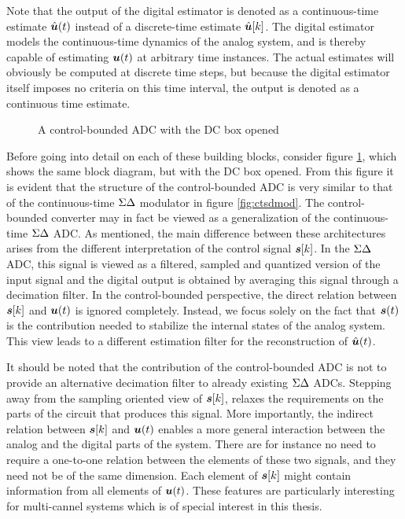 Note that the output of the digital estimator is denoted as a continuous-time estimate $\hat{\bm{u}}(t)$ instead of a discrete-time estimate $\hat{\bm{u}}[k]$. The digital estimator models the continuous-time dynamics of the analog system, and is thereby capable of estimating $\bm{u}(t)$ at arbitrary time instances. The actual estimates will obviously be computed at discrete time steps, but because the digital estimator itself imposes no criteria on this time interval, the output is denoted as a continuous time estimate.

\begin{figure}[htbp]
    \centering
    
    \caption{A control-bounded ADC with the DC box opened}
    \label{fig:cbadc2}
\end{figure}

Before going into detail on each of these building blocks, consider figure \ref{fig:cbadc2}, which shows the same block diagram, but with the DC box opened. From this figure it is evident that the structure of the control-bounded ADC is very similar to that of the continuous-time $\Sigma\Delta$ modulator in figure \ref{fig:ctsdmod}. The control-bounded converter may in fact be viewed as a generalization of the continuous-time $\Sigma\Delta$ ADC. As mentioned, the main difference between these architectures arises from the different interpretation of the control signal $\bm{s}[k]$. In the $\Sigma\Delta$ ADC, this signal is viewed as a filtered, sampled and quantized version of the input signal and the digital output is obtained by averaging this signal through a decimation filter. In the control-bounded perspective, the direct relation between $\bm{s}[k]$ and $\bm{u}(t)$ is ignored completely. Instead, we focus solely on the fact that $\bm{s}(t)$ is the contribution needed to stabilize the internal states of the analog system. This view leads to a different estimation filter for the reconstruction of $\hat{\bm{u}}(t)$.

It should be noted that the contribution of the control-bounded ADC is not to provide an alternative decimation filter to already existing $\Sigma\Delta$ ADCs. Stepping away from the sampling oriented view of $\bm{s}[k]$, relaxes the requirements on the parts of the circuit that produces this signal. More importantly, the indirect relation between $\bm{s}[k]$ and $\bm{u}(t)$ enables a more general interaction between the analog and the digital parts of the system. There are for instance no need to require a one-to-one relation between the elements of these two signals, and they need not be of the same dimension. Each element of $\bm{s}[k]$ might contain information from all elements of $\bm{u}(t)$. These features are particularly interesting for multi-cannel systems which is of special interest in this thesis.


















